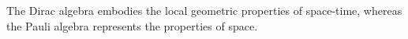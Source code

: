 \begin{frame}[allowframebreaks]
\begin{enumerate}
{\color{blue} The Dirac algebra embodies the local geometric properties of space-time, whereas the Pauli algebra represents the properties of space}. %

\end{enumerate}
\end{frame}
